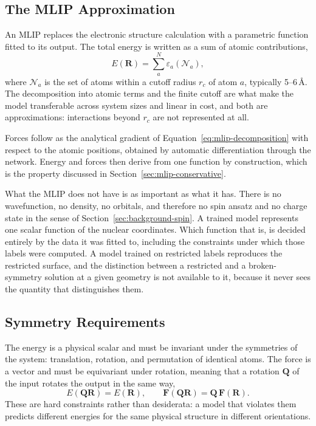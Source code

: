 \subsection{The MLIP Approximation}
\label{sec:mlip-approximation}
 
An MLIP replaces the electronic structure calculation with a parametric function
fitted to its output. The total energy is written as a sum of atomic contributions,
%
\begin{equation}
  E(\mathbf{R}) = \sum_{a}^{N} \varepsilon_a\!\left( \mathcal{N}_a \right),
  \label{eq:mlip-decomposition}
\end{equation}
%
where $\mathcal{N}_a$ is the set of atoms within a cutoff radius $r_c$ of atom $a$,
typically 5--6\,\AA. The decomposition into atomic terms and the finite cutoff are
what make the model transferable across system sizes and linear in cost, and both
are approximations: interactions beyond $r_c$ are not represented at all.
 
Forces follow as the analytical gradient of Equation~\ref{eq:mlip-decomposition}
with respect to the atomic positions, obtained by automatic differentiation through
the network. Energy and forces then derive from one function by construction, which
is the property discussed in Section~\ref{sec:mlip-conservative}.
 
What the MLIP does not have is as important as what it has. There is no
wavefunction, no density, no orbitals, and therefore no spin ansatz and no charge
state in the sense of Section~\ref{sec:background-spin}. A trained model represents
one scalar function of the nuclear coordinates. Which function that is, is decided
entirely by the data it was fitted to, including the constraints under which those
labels were computed. A model trained on restricted labels reproduces the restricted
surface, and the distinction between a restricted and a broken-symmetry solution at
a given geometry is not available to it, because it never sees the quantity that
distinguishes them.
 
\subsection{Symmetry Requirements}
\label{sec:mlip-symmetry}
 
The energy is a physical scalar and must be invariant under the symmetries of the
system: translation, rotation, and permutation of identical atoms. The force is a
vector and must be equivariant under rotation, meaning that a rotation $\mathbf{Q}$
of the input rotates the output in the same way,
%
\begin{equation}
  E(\mathbf{Q}\mathbf{R}) = E(\mathbf{R}), \qquad
  \mathbf{F}(\mathbf{Q}\mathbf{R}) = \mathbf{Q}\,\mathbf{F}(\mathbf{R}).
\end{equation}
%
These are hard constraints rather than desiderata: a model that violates them
predicts different energies for the same physical structure in different orientations.
 
